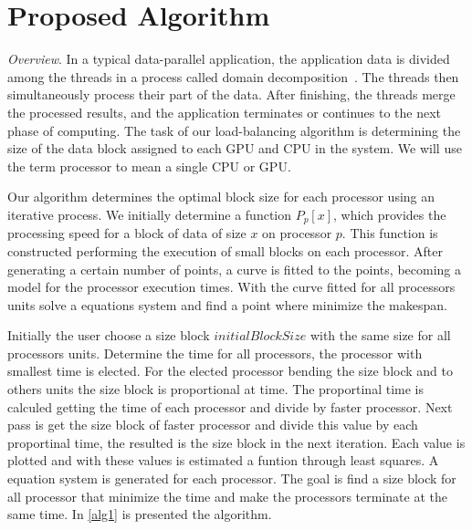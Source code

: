 \documentclass[journal]{IEEEtran}
\begin{document}
%


\section{Proposed Algorithm}

\textit{Overview}. In a typical data-parallel application, the application data
is divided among the threads in a process called domain
decomposition~\cite{Gropp:1992uq}. The threads then simultaneously process their
part of the data. After finishing, the threads merge the processed results, and
the application terminates or continues to the next phase of computing. The task
of our load-balancing algorithm is determining the size of the data block
assigned to each GPU and CPU in the system. We will use the term processor to
mean a single CPU or GPU.

Our algorithm determines the optimal block size for each processor using an
iterative process. We initially determine a function $P_p[x]$, which provides
the processing speed for a block of data of size $x$ on processor $p$. This
function is constructed performing the execution of small blocks on each
processor. After generating a certain number of points, a curve is fitted to the
points, becoming a model for the processor execution times. With the curve fitted for all processors units solve a equations system and find a point where minimize the makespan.

Initially the user choose a size block $initialBlockSize$ with the same size for all processors units. Determine the time for all processors, the processor with smallest time is elected. For the elected processor bending the size block and to others units the size block is proportional at time. The proportinal time is calculed getting the time of each processor and divide by faster processor. Next pass is get the size block of faster processor and divide this value by each proportinal time, the resulted is the size block in the next iteration. Each value is plotted and with these values is estimated a funtion through least squares.  A equation system is generated for each processor. The goal is find a size block for all processor that minimize the time and make the processors terminate at the same time. In \ref{alg1} is presented the algorithm. 
\end{document}
